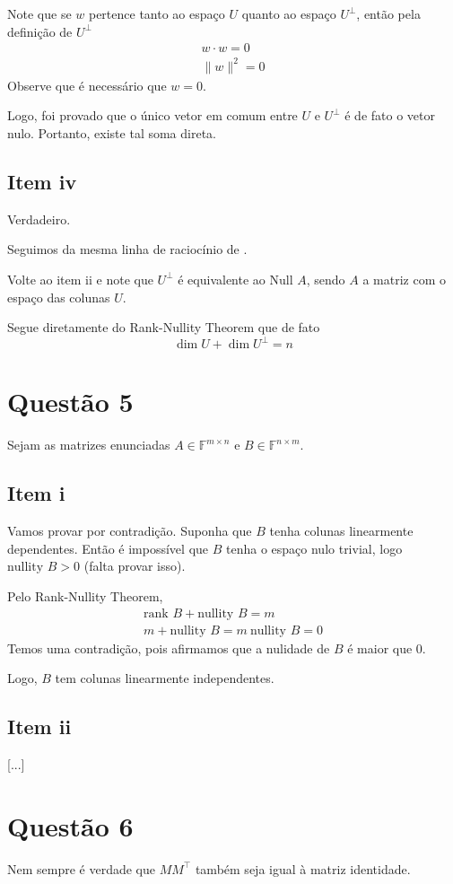 \documentclass{article}
\newcommand{\F}[1]{\mathbb{F}^{#1}}
\newcommand{\Null}[1]{\textrm{Null } #1}
\newcommand{\nullity}[1]{\textrm{nullity } #1}
\newcommand{\rank}[1]{\textrm{rank } #1}
\begin{document}
Note que se $w$ pertence tanto ao espaço $U$ quanto ao espaço $U^\bot$, então pela definição de $U^\bot$
\begin{align*}
    w \cdot w = 0\\
    \lVert w \rVert^2 = 0
\end{align*}
Observe que é necessário que $w = 0$.

Logo, foi provado que o único vetor em comum entre $U$ e $U^\bot$ é de fato o vetor nulo.
Portanto, existe tal soma direta.

\subsection*{Item iv}
Verdadeiro.

Seguimos da mesma linha de raciocínio de .

Volte ao item ii e note que $U^\bot$ é equivalente ao $\Null{A}$, sendo $A$ a matriz com o espaço das colunas $U$.

Segue diretamente do Rank-Nullity Theorem que de fato
\[ \dim U + \dim U^\bot = n \]



\section*{Questão 5}
Sejam as matrizes enunciadas $A \in \F{m \times n}$ e $B \in \F{n \times m}$.

\subsection*{Item i}
Vamos provar por contradição.
Suponha que $B$ tenha colunas linearmente dependentes.
Então é impossível que $B$ tenha o espaço nulo trivial, logo $\nullity{B} > 0$ (falta provar isso).

Pelo Rank-Nullity Theorem,
\begin{align*}
    \rank{B} + \nullity{B} = m \\
    m + \nullity{B} = m \
    \nullity{B} = 0
\end{align*}
Temos uma contradição, pois afirmamos que a nulidade de $B$ é maior que 0.

Logo, $B$ tem colunas linearmente independentes.

\subsection*{Item ii}
[...]

\section*{Questão 6}
Nem sempre é verdade que $M M^\intercal$ também seja igual à matriz identidade.
\end{document}
